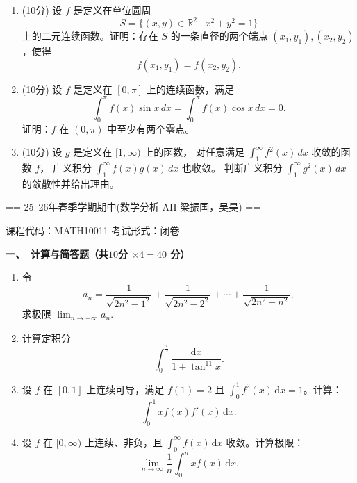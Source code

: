 \begin{enumerate}
(2) 证明：
\[
\int_{0}^{1}\left(\sum_{n=1}^{\infty}x^{2n}\ln x\right)dx
=
\sum_{n=1}^{\infty}\left(\int_{0}^{1}x^{2n}\ln x\,dx\right).
\]
（10分）

\item (10分)
设 \(f\) 是定义在单位圆周
\[
S=\{(x,y)\in\mathbb{R}^2 \mid x^2+y^2=1\}
\]
上的二元连续函数。证明：存在 \(S\) 的一条直径的两个端点 \((x_1,y_1), (x_2,y_2)\)，使得
\[
f(x_1,y_1)=f(x_2,y_2).
\]

\item (10分)
设 \(f\) 是定义在 \([0,\pi]\) 上的连续函数，满足
\[
\int_{0}^{\pi} f(x)\sin x\,dx = \int_{0}^{\pi} f(x)\cos x\,dx = 0.
\]
证明：\(f\) 在 \((0,\pi)\) 中至少有两个零点。

\item (10分)
设 \(g\) 是定义在 \([1,\infty)\) 上的函数，
对任意满足 \(\displaystyle\int_{1}^{\infty} f^{2}(x)\,dx\) 收敛的函数 \(f\)，
广义积分 \(\displaystyle\int_{1}^{\infty} f(x)g(x)\,dx\) 也收敛。
判断广义积分 \(\displaystyle\int_{1}^{\infty} g^{2}(x)\,dx\) 的敛散性并给出理由。
\end{enumerate}

== 25--26年春季学期期中(数学分析 AII 梁振国，吴昊) ==

\begin{center}
课程代码：MATH10011 \quad 考试形式：闭卷
\end{center}

\textbf{一、\ 计算与简答题（共$10$分 $\times 4 = 40$ 分）}

\begin{enumerate}
    \item 令
    \[
    a_n = \frac{1}{\sqrt{2n^2 - 1^2}} + \frac{1}{\sqrt{2n^2 - 2^2}} + \cdots + \frac{1}{\sqrt{2n^2 - n^2}},
    \]
    求极限 $\displaystyle \lim_{n\to+\infty} a_n$.

    \item 计算定积分
    \[
    \int_0^{\frac{\pi}{2}} \frac{\mathrm{d}x}{1 + \tan^{11}x}.
    \]

    \item 设 $f$ 在 $[0,1]$ 上连续可导，满足 $f(1)=2$ 且 $\displaystyle \int_0^1 f^2(x)\,\mathrm{d}x = 1$。计算：
    \[
    \int_0^1 x f(x) f'(x)\,\mathrm{d}x.
    \]

    \item 设 $f$ 在 $[0,\infty)$ 上连续、非负，且 $\displaystyle \int_0^\infty f(x)\,\mathrm{d}x$ 收敛。计算极限：
    \[
    \lim_{n\to\infty} \frac{1}{n} \int_0^n x f(x)\,\mathrm{d}x.
    \]
\end{enumerate}

